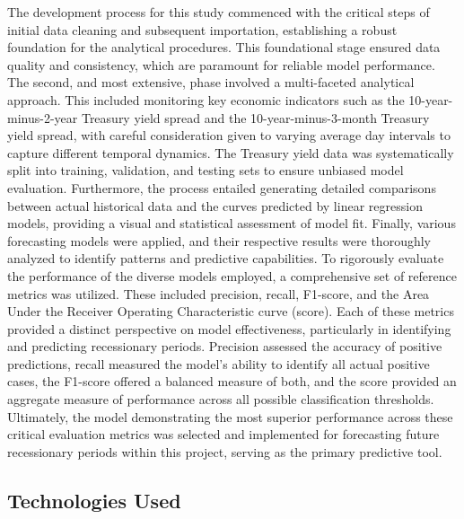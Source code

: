 The development process for this study commenced with the critical steps of initial data cleaning and subsequent importation, establishing a robust foundation for the analytical procedures. This foundational stage ensured data quality and consistency, which are paramount for reliable model performance. The second, and most extensive, phase involved a multi-faceted analytical approach. This included monitoring key economic indicators such as the 10-year-minus-2-year Treasury yield spread and the 10-year-minus-3-month Treasury yield spread, with careful consideration given to varying average day intervals to capture different temporal dynamics. The Treasury yield data was systematically split into training, validation, and testing sets to ensure unbiased model evaluation. Furthermore, the process entailed generating detailed comparisons between actual historical data and the curves predicted by linear regression models, providing a visual and statistical assessment of model fit. Finally, various forecasting models were applied, and their respective results were thoroughly analyzed to identify patterns and predictive capabilities.
To rigorously evaluate the performance of the diverse models employed, a comprehensive set of reference metrics was utilized. These included precision, recall, F1-score, and the Area Under the Receiver Operating Characteristic curve (\AUCone score). Each of these metrics provided a distinct perspective on model effectiveness, particularly in identifying and predicting recessionary periods. Precision assessed the accuracy of positive predictions, recall measured the model's ability to identify all actual positive cases, the F1-score offered a balanced measure of both, and the \AUCone score provided an aggregate measure of performance across all possible classification thresholds. Ultimately, the model demonstrating the most superior performance across these critical evaluation metrics was selected and implemented for forecasting future recessionary periods within this project, serving as the primary predictive tool.


\subsection{Technologies Used}

